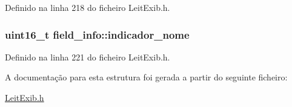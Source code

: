 Definido na linha 218 do ficheiro Leit\-Exib.\-h.

\hypertarget{structfield__info_a15c229849e95ecf75de50a79a3760c00}{
\subsubsection[{indicador\-\_\-nome}]{\setlength{\rightskip}{0pt plus 5cm}uint16\-\_\-t field\-\_\-info\-::indicador\-\_\-nome}}\label{structfield__info_a15c229849e95ecf75de50a79a3760c00}


Definido na linha 221 do ficheiro Leit\-Exib.\-h.



A documentação para esta estrutura foi gerada a partir do seguinte ficheiro\-:\begin{DoxyCompactItemize}
\item 
\hyperlink{_leit_exib_8h}{Leit\-Exib.\-h}\end{DoxyCompactItemize}
